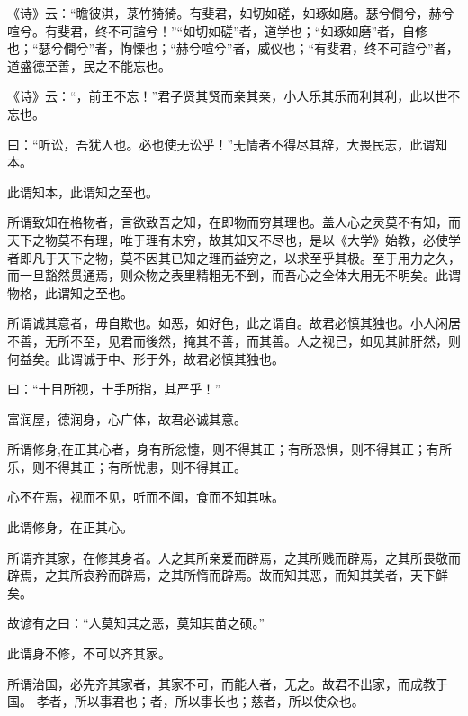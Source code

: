 \documentclass[twoside,openany]{book}
\begin{document}
\begin{pinyinscope}
《诗》云：“瞻彼淇，菉竹猗猗。有斐君，如切如磋，如琢如磨。瑟兮僴兮，赫兮喧兮。有斐君，终不可諠兮！”“如切如磋”者，道学也；“如琢如磨”者，自修也；“瑟兮僴兮”者，恂慄也；“赫兮喧兮”者，威仪也；“有斐君，终不可諠兮”者，道盛德至善，民之不能忘也。

《诗》云：“，前王不忘！”君子贤其贤而亲其亲，小人乐其乐而利其利，此以世不忘也。

曰：“听讼，吾犹人也。必也使无讼乎！”无情者不得尽其辞，大畏民志，此谓知本。

此谓知本，此谓知之至也。

所谓致知在格物者，言欲致吾之知，在即物而穷其理也。盖人心之灵莫不有知，而天下之物莫不有理，唯于理有未穷，故其知又不尽也，是以《大学》始教，必使学者即凡于天下之物，莫不因其已知之理而益穷之，以求至乎其极。至于用力之久，而一旦豁然贯通焉，则众物之表里精粗无不到，而吾心之全体大用无不明矣。此谓物格，此谓知之至也。

所谓诚其意者，毋自欺也。如恶，如好色，此之谓自。故君必慎其独也。小人闲居不善，无所不至，见君而後然，掩其不善，而其善。人之视己，如见其肺肝然，则何益矣。此谓诚于中、形于外，故君必慎其独也。

曰：“十目所视，十手所指，其严乎！”

富润屋，德润身，心广体，故君必诚其意。

所谓修身,在正其心者，身有所忿懥，则不得其正；有所恐惧，则不得其正；有所乐，则不得其正；有所忧患，则不得其正。

心不在焉，视而不见，听而不闻，食而不知其味。

此谓修身，在正其心。

所谓齐其家，在修其身者。人之其所亲爱而辟焉，之其所贱而辟焉，之其所畏敬而辟焉，之其所哀矜而辟焉，之其所惰而辟焉。故而知其恶，而知其美者，天下鲜矣。

故谚有之曰：“人莫知其之恶，莫知其苗之硕。”

此谓身不修，不可以齐其家。

所谓治国，必先齐其家者，其家不可，而能人者，无之。故君不出家，而成教于国。
孝者，所以事君也；者，所以事长也；慈者，所以使众也。


\end{pinyinscope}
\end{document}
